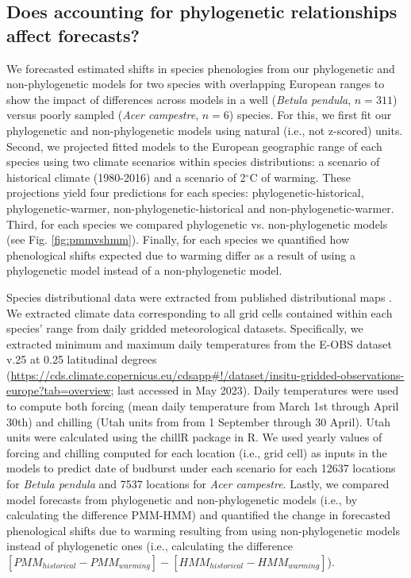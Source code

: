 \documentclass[11pt]{article}
\begin{document}
\subsection{Does accounting for phylogenetic relationships affect forecasts?}
We forecasted estimated shifts in species phenologies from our phylogenetic and non-phylogenetic models for two species with overlapping European ranges to show the impact of differences across models in a well (\emph{Betula pendula}, $n=311$) versus poorly sampled  (\emph{Acer campestre}, $n=6$) species. For this, we first fit our phylogenetic and non-phylogenetic models using natural (i.e., not z-scored) units. Second, we projected fitted models to the European geographic range of each species using two climate scenarios within species distributions: a scenario of historical climate (1980-2016) and a scenario of 2$^{\circ}$C of warming. These projections yield four predictions for each species: phylogenetic-historical, phylogenetic-warmer, non-phylogenetic-historical and non-phylogenetic-warmer. Third, for each species we compared phylogenetic vs. non-phylogenetic models (see Fig. \ref{fig:pmmvshmm}). Finally, for each species we quantified how phenological shifts expected due to warming differ as a result of using a phylogenetic model instead of a non-phylogenetic model.  

Species distributional data were extracted from published distributional maps \citep{caudullo2017chorological}. We extracted climate data corresponding to all grid cells contained within each species' range from daily gridded meteorological datasets. Specifically, we extracted minimum and maximum daily temperatures from the E-OBS dataset v.25 at 0.25 latitudinal degrees (\url{https://cds.climate.copernicus.eu/cdsapp#!/dataset/insitu-gridded-observations-europe?tab=overview}; last accessed in May 2023). Daily temperatures were used to compute both forcing (mean daily temperature from March 1st through April 30th) and chilling (Utah units from from 1 September through 30 April). Utah units were calculated using the chillR package in R. We used yearly values of forcing and chilling computed for each location (i.e., grid cell) as inputs in the models to predict date of budburst under each scenario for each 12637 locations for \emph{Betula pendula} and 7537 locations for \emph{Acer campestre}. Lastly, we compared model forecasts from phylogenetic and non-phylogenetic models (i.e., by calculating the difference PMM-HMM) and quantified the change in forecasted phenological shifts due to warming resulting from using non-phylogenetic models instead of phylogenetic ones (i.e., calculating the difference $[PMM_{historical} -PMM_{warming}]-[HMM_{historical}-HMM_{warming}]$).
\end{document}
